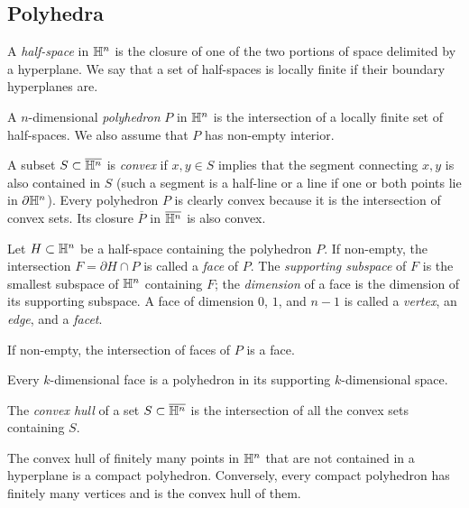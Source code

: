 \subsection{Polyhedra} \label{polyhedra:subsection}
A \emph{half-space} in $\mathbb{H}^n$ is the closure of one of the two portions of space delimited by a hyperplane. We say that a set of half-spaces is locally finite if their boundary hyperplanes are. 

\begin{defn}
A $n$-dimensional \emph{polyhedron} $P$ in $\mathbb{H}^n$ is the intersection of a locally finite set of half-spaces. We also assume that $P$ has non-empty interior.
\end{defn}

A subset $S\subset \overline{\mathbb{H}^n}$ is \emph{convex} if $x,y\in S$ implies that the segment connecting $x,y$ is also contained in $S$ (such a segment is a half-line or a line if one or both points lie in $\partial \mathbb{H}^n$). Every polyhedron $P$ is clearly convex because it is the intersection of convex sets. Its closure $\overline P$ in $\overline{\mathbb{H}^n}$ is also convex.

Let $H\subset \mathbb{H}^n$ be a half-space containing the polyhedron $P$. If non-empty, the intersection $F=\partial H\cap P$ is called a \emph{face} of $P$. The \emph{supporting subspace} of $F$ is the smallest subspace of $\mathbb{H}^n$ containing $F$; the \emph{dimension} of a face is the dimension of its supporting subspace. A face of dimension $0$, $1$, and $n-1$ is called a \emph{vertex}, an \emph{edge}, and a \emph{facet}.

\begin{ex} \label{intersection:faces:ex}
If non-empty, the intersection of faces of $P$ is a face.
\end{ex}

\begin{ex} Every $k$-dimensional face is a polyhedron in its supporting $k$-dimensional space.
\end{ex}

The \emph{convex hull} of a set $S\subset \overline{\mathbb{H}^n}$ is the intersection of all the convex sets containing $S$. 

\begin{ex} \label{hull:ex}
The convex hull of finitely many points in $\mathbb{H}^n$ that are not contained in a hyperplane is a compact polyhedron. Conversely, every compact polyhedron has finitely many vertices and is the convex hull of them.
\end{ex}


